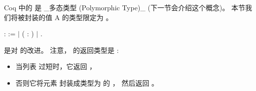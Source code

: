 \documentclass[12pt]{report}
\begin{document}
{{{  Coq 中的  是 \_多态类型 (Polymorphic Type)\_
  (下一节会介绍这个概念)。
  本节我们将被封装的值 A 的类型限定为 。
\begin{coqdoccode}
\coqdocemptyline
\coqdocnoindent
{}  :  :=\coqdoceol
\coqdocindent{1.00em}
\ensuremath{|}  ( : )\coqdoceol
\coqdocindent{1.00em}
\ensuremath{|} .\coqdoceol
\coqdocemptyline
\end{coqdoccode}
   是对  的改进。
  注意， 的返回类型是 :

\begin{itemize}
\item  当列表  过短时，它返回 ，

\item  否则它将元素  封装成类型为  的  ，
    然后返回  。


\end{itemize}}}}
\end{document}
